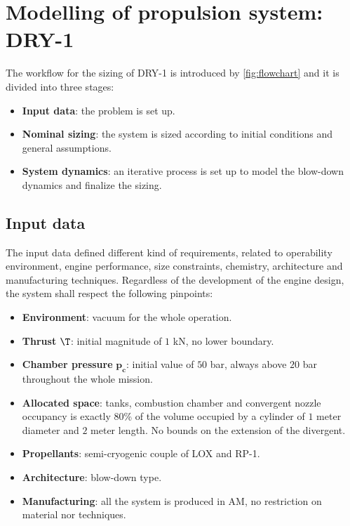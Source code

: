\section{Modelling of propulsion system: DRY-1}
\label{sec:modelling}

The workflow for the sizing of DRY-1 is introduced by \autoref{fig:flowchart} and it is divided into three stages:
\begin{itemize}
    \item \textbf{Input data}:  the problem is set up. 
    \item \textbf{Nominal sizing}: the system is sized according to initial conditions and general assumptions.
    \item \textbf{System dynamics}: an iterative process is set up to model the blow-down dynamics and finalize the sizing.
\end{itemize}


\subsection{Input data}
\label{subsec:input_data}

The input data defined different kind of requirements, related to operability environment, engine performance, size constraints, chemistry, architecture and manufacturing techniques. Regardless of the development of the engine design, the system shall respect the following pinpoints:
\begin{itemize}
    \item \textbf{Environment}: vacuum for the whole operation.
    \item \textbf{Thrust} $\boldsymbol{\T}$: initial magnitude of $1$ kN, no lower boundary.
    \item \textbf{Chamber pressure} $\boldsymbol{p_c}$: initial value of $50$ bar, always above $20$ bar throughout the whole mission.
    \item \textbf{Allocated space}: tanks, combustion chamber and convergent nozzle occupancy is exactly $80$\% of the volume occupied by a cylinder of $1$ meter diameter and $2$ meter length. No bounds on the extension of the divergent.
    \item \textbf{Propellants}: semi-cryogenic couple of LOX and RP-1.
    \item \textbf{Architecture}: blow-down type.
    \item \textbf{Manufacturing}: all the system is produced in AM, no restriction on material nor techniques. 
\end{itemize} 

